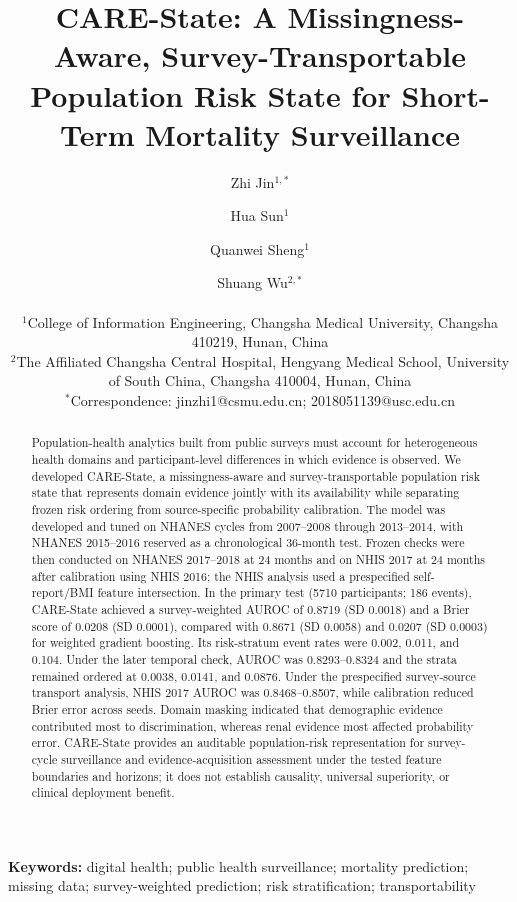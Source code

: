 \documentclass[12pt]{article}
\title{CARE-State: A Missingness-Aware, Survey-Transportable Population Risk State for Short-Term Mortality Surveillance}
\author{Zhi Jin$^{1,*}$ \and Hua Sun$^{1}$ \and Quanwei Sheng$^{1}$ \and Shuang Wu$^{2,*}$\\[4pt]
\parbox{0.88\textwidth}{\centering\small
$^{1}$College of Information Engineering, Changsha Medical University, Changsha 410219, Hunan, China\\
$^{2}$The Affiliated Changsha Central Hospital, Hengyang Medical School, University of South China, Changsha 410004, Hunan, China\\
$^{*}$Correspondence: jinzhi1@csmu.edu.cn; 2018051139@usc.edu.cn}}
\date{}
\begin{document}
\maketitle
\begin{abstract}
Population-health analytics built from public surveys must account for heterogeneous health domains and participant-level differences in which evidence is observed. We developed CARE-State, a missingness-aware and survey-transportable population risk state that represents domain evidence jointly with its availability while separating frozen risk ordering from source-specific probability calibration. The model was developed and tuned on NHANES cycles from 2007--2008 through 2013--2014, with NHANES 2015--2016 reserved as a chronological 36-month test. Frozen checks were then conducted on NHANES 2017--2018 at 24 months and on NHIS 2017 at 24 months after calibration using NHIS 2016; the NHIS analysis used a prespecified self-report/BMI feature intersection. In the primary test (5710 participants; 186 events), CARE-State achieved a survey-weighted AUROC of 0.8719 (SD 0.0018) and a Brier score of 0.0208 (SD 0.0001), compared with 0.8671 (SD 0.0058) and 0.0207 (SD 0.0003) for weighted gradient boosting. Its risk-stratum event rates were 0.002, 0.011, and 0.104. Under the later temporal check, AUROC was 0.8293--0.8324 and the strata remained ordered at 0.0038, 0.0141, and 0.0876. Under the prespecified survey-source transport analysis, NHIS 2017 AUROC was 0.8468--0.8507, while calibration reduced Brier error across seeds. Domain masking indicated that demographic evidence contributed most to discrimination, whereas renal evidence most affected probability error. CARE-State provides an auditable population-risk representation for survey-cycle surveillance and evidence-acquisition assessment under the tested feature boundaries and horizons; it does not establish causality, universal superiority, or clinical deployment benefit.
\end{abstract}
\noindent\textbf{Keywords:} digital health; public health surveillance; mortality prediction; missing data; survey-weighted prediction; risk stratification; transportability
\end{document}
